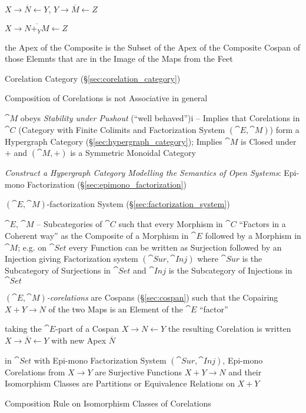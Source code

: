$X \rightarrow \overline{N} \leftarrow Y$, $Y \rightarrow \overline{M}
\leftarrow Z$

$X \rightarrow \overline{N +_Y M} \leftarrow Z$

the Apex of the Composite is the Subset of the Apex of the Composite
Cospan of those Elemnts that are in the Image of the Maps from the
Feet %

Corelation Category (\S\ref{sec:corelation_category})

Composition of Corelations is not Associative in general

$\cat{M}$ obeys \emph{Stability under Pushout} (``well behaved'')i --
Implies that Corelations in $\cat{C}$ (Category with Finite Colimits
and Factorization System $(\cat{E},\cat{M})$) form a Hypergraph
Category (\S\ref{sec:hypergraph_category}); Implies $\cat{M}$ is
Closed under $+$ and $(\cat{M},+)$ is a Symmetric Monoidal Category

\emph{Construct a Hypergraph Category Modelling the Semantics of Open
  Systems}: Epi-mono Factorization (\S\ref{sec:epimono_factorization})


$(\cat{E},\cat{M})$-factorization System
(\S\ref{sec:factorization_system})

$\cat{E}$, $\cat{M}$ -- Subcategories of $\cat{C}$ such that every
Morphism in $\cat{C}$ ``Factors in a Coherent way'' as the Composite
of a Morphism in $\cat{E}$ followed by a Morphism in $\cat{M}$; e.g.
on $\cat{Set}$ every Function can be written as Surjection followed by
an Injection giving Factorization system $(\cat{Sur},\cat{Inj})$ where
$\cat{Sur}$ is the Subcategory of Surjections in $\cat{Set}$ and
$\cat{Inj}$ is the Subcategory of Injections in $\cat{Set}$

\emph{$(\cat{E},\cat{M})$-corelations} are Cospans
(\S\ref{sec:cospan}) such that the Copairing $X + Y \rightarrow N$ of
the two Maps is an Element of the $\cat{E}$ ``factor''

taking the $\cat{E}$-part of a Cospan $X \rightarrow N \leftarrow Y$
the resulting Corelation is written $X \rightarrow \overline{N}
\leftarrow Y$ with new Apex $\overline{N}$

in $\cat{Set}$ with Epi-mono Factorization System $(\cat{Sur},
\cat{Inj})$, Epi-mono Corelations from $X \rightarrow Y$ are
Surjective Functions $X + Y \rightarrow N$ and their Isomorphism
Classes are Partitions or Equivalence Relations on $X + Y$

Composition Rule on Isomorphism Classes of Corelations %


